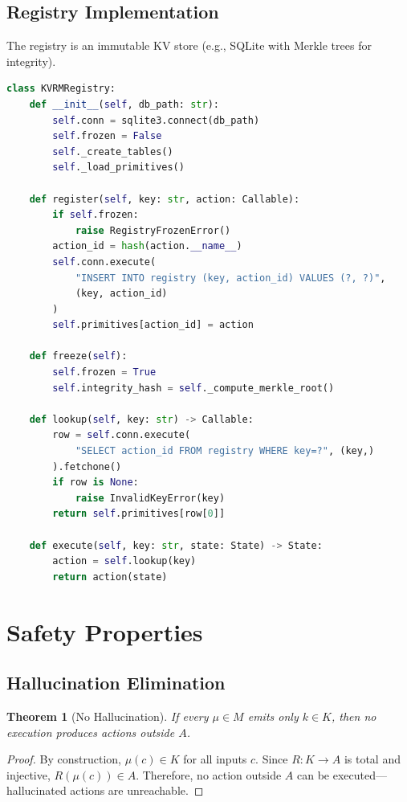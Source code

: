 \documentclass[11pt,a4paper]{article}
\newtheorem{theorem}{Theorem}[section]
\begin{document}
\subsection{Registry Implementation}

The registry is an immutable KV store (e.g., SQLite with Merkle trees for integrity).

\begin{lstlisting}[language=Python,caption={Registry Implementation},label={lst:registry}]
class KVRMRegistry:
    def __init__(self, db_path: str):
        self.conn = sqlite3.connect(db_path)
        self.frozen = False
        self._create_tables()
        self._load_primitives()

    def register(self, key: str, action: Callable):
        if self.frozen:
            raise RegistryFrozenError()
        action_id = hash(action.__name__)
        self.conn.execute(
            "INSERT INTO registry (key, action_id) VALUES (?, ?)",
            (key, action_id)
        )
        self.primitives[action_id] = action

    def freeze(self):
        self.frozen = True
        self.integrity_hash = self._compute_merkle_root()

    def lookup(self, key: str) -> Callable:
        row = self.conn.execute(
            "SELECT action_id FROM registry WHERE key=?", (key,)
        ).fetchone()
        if row is None:
            raise InvalidKeyError(key)
        return self.primitives[row[0]]

    def execute(self, key: str, state: State) -> State:
        action = self.lookup(key)
        return action(state)
\end{lstlisting}

\section{Safety Properties}
\label{sec:safety}

\subsection{Hallucination Elimination}

\begin{theorem}[No Hallucination]
If every $\mu \in M$ emits only $k \in K$, then no execution produces actions outside $A$.
\end{theorem}

\begin{proof}
By construction, $\mu(c) \in K$ for all inputs $c$. Since $R: K \to A$ is total and injective, $R(\mu(c)) \in A$. Therefore, no action outside $A$ can be executed---hallucinated actions are unreachable.
\end{proof}
\end{document}
